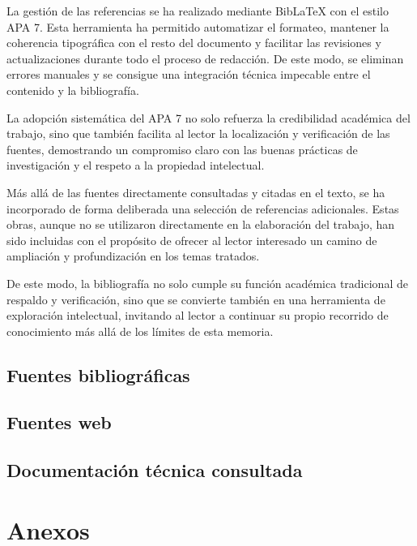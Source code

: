 \documentclass[11.5pt]{article}
\begin{document}
	La gestión de las referencias se ha realizado mediante BibLaTeX con el estilo APA 7. Esta herramienta ha permitido automatizar el formateo, mantener la coherencia tipográfica con el resto del documento y facilitar las revisiones y actualizaciones durante todo el proceso de redacción. De este modo, se eliminan errores manuales y se consigue una integración técnica impecable entre el contenido y la bibliografía.
	
	La adopción sistemática del APA 7 no solo refuerza la credibilidad académica del trabajo, sino que también facilita al lector la localización y verificación de las fuentes, demostrando un compromiso claro con las buenas prácticas de investigación y el respeto a la propiedad intelectual.
	
	Más allá de las fuentes directamente consultadas y citadas en el texto, se ha incorporado de forma deliberada una selección de referencias adicionales. Estas obras, aunque no se utilizaron directamente en la elaboración del trabajo, han sido incluidas con el propósito de ofrecer al lector interesado un camino de ampliación y profundización en los temas tratados.
	
	De este modo, la bibliografía no solo cumple su función académica tradicional de respaldo y verificación, sino que se convierte también en una herramienta de exploración intelectual, invitando al lector a continuar su propio recorrido de conocimiento más allá de los límites de esta memoria.
	\subsection{Fuentes bibliográficas}
	
	\printbibliography[heading=none, type=book]
	\printbibliography[heading=none, type=article]
	
	\subsection{Fuentes web}
	
	\printbibliography[heading=none, type=online]
	
	\subsection{Documentación técnica consultada}
	
	\printbibliography[heading=none, type=manual]
	\printbibliography[heading=none, type=report]
	
	\section{Anexos}
\end{document}
